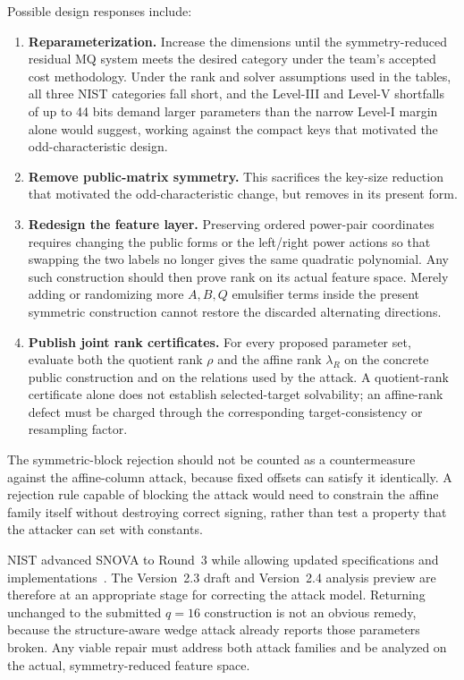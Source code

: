 \documentclass[11pt]{article}
\newcommand{\SNOVA}{\textsf{SNOVA}}
\begin{document}
Possible design responses include:
\begin{enumerate}
\item \textbf{Reparameterization.} Increase the dimensions until the symmetry-reduced residual MQ system meets the desired category under the team's accepted cost methodology.  Under the rank and solver assumptions used in the tables, all three NIST categories fall short, and the Level-III and Level-V shortfalls of up to 44 bits demand larger parameters than the narrow Level-I margin alone would suggest, working against the compact keys that motivated the odd-characteristic design.
\item \textbf{Remove public-matrix symmetry.} This sacrifices the key-size reduction that motivated the odd-characteristic change, but removes  in its present form.
\item \textbf{Redesign the feature layer.} Preserving ordered power-pair coordinates requires changing the public forms or the left/right power actions so that swapping the two labels no longer gives the same quadratic polynomial.  Any such construction should then prove rank on its actual feature space.  Merely adding or randomizing more $A,B,Q$ emulsifier terms inside the present symmetric construction cannot restore the discarded alternating directions.
\item \textbf{Publish joint rank certificates.} For every proposed parameter set, evaluate both the quotient rank $\rho$ and the affine rank $\lambda_R$ on the concrete public construction and on the relations used by the attack.  A quotient-rank certificate alone does not establish selected-target solvability; an affine-rank defect must be charged through the corresponding target-consistency or resampling factor.
\end{enumerate}

The symmetric-block rejection should not be counted as a countermeasure against the affine-column attack, because fixed offsets can satisfy it identically.  A rejection rule capable of blocking the attack would need to constrain the affine family itself without destroying correct signing, rather than test a property that the attacker can set with constants.

NIST advanced \SNOVA{} to Round~3 while allowing updated specifications and implementations~\cite{NISTRound3}.  The Version~2.3 draft and Version~2.4 analysis preview are therefore at an appropriate stage for correcting the attack model.  Returning unchanged to the submitted $q=16$ construction is not an obvious remedy, because the structure-aware wedge attack already reports those parameters broken.  Any viable repair must address both attack families and be analyzed on the actual, symmetry-reduced feature space.
\end{document}
